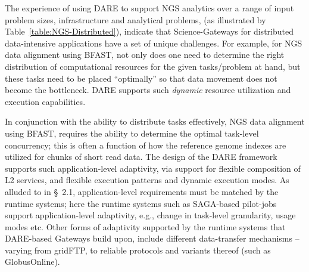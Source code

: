 \documentclass[]{svjour3}
\begin{document}


The experience of using DARE to support NGS analytics over a range of
input problem sizes, infrastructure and analytical problems, (as
illustrated by Table~\ref{table:NGS-Distributed}), indicate that
Science-Gateways for distributed data-intensive applications have a
set of unique challenges. For example, for NGS data alignment using
BFAST, not only does one need to determine the right distribution of
computational resources for the given tasks/problem at hand, but these
tasks need to be placed ``optimally'' so that data movement does not
become the bottleneck. DARE supports such {\it dynamic} resource
utilization and execution capabilities.


In conjunction with the ability to distribute tasks effectively, NGS
data alignment using BFAST, requires the ability to determine the
optimal task-level concurrency; this is often a function of how the
reference genome indexes are utilized for chunks of short read
data\cite{dare-ecmls11}.  The design of the DARE framework supports
such application-level adaptivity, via support for flexible
composition of L2 services, and flexible execution patterns and
dynamic execution modes. As alluded to in \S~2.1, application-level
requirements must be matched by the runtime systems; here the runtime
systems such as SAGA-based pilot-jobs support application-level
adaptivity, e.g., change in task-level granularity, usage modes etc.
Other forms of adaptivity supported by the runtime systems that
DARE-based Gateways build upon, include different data-transfer
mechanisms -- varying from gridFTP, to reliable protocols and variants
thereof (such as GlobusOnline).

\end{document}
